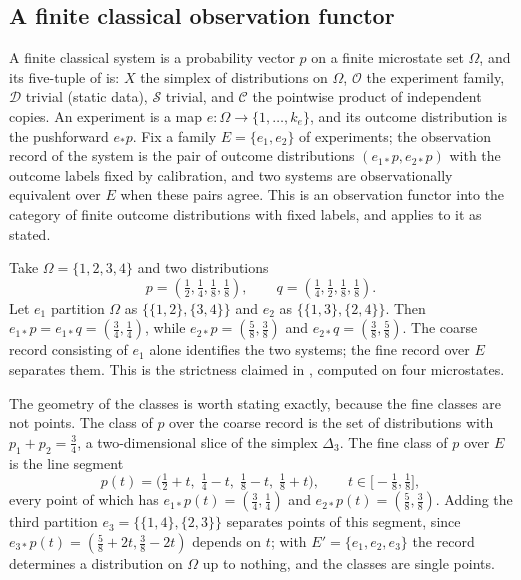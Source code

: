 \documentclass[11pt,letterpaper]{article}
\theoremstyle{definition}
\theoremstyle{remark}
\begin{document}
\subsection{A finite classical observation functor}

A finite classical system is a probability vector $p$ on a finite microstate set $\Omega$, and its five-tuple of  is: $X$ the simplex of distributions on $\Omega$, $\mathcal{O}$ the experiment family, $\mathcal{D}$ trivial (static data), $\mathcal{S}$ trivial, and $\mathcal{C}$ the pointwise product of independent copies. An experiment is a map $e \colon \Omega \to \{1, \ldots, k_e\}$, and its outcome distribution is the pushforward $e_* p$. Fix a family $E = \{e_1, e_2\}$ of experiments; the observation record of the system is the pair of outcome distributions $(e_{1*} p, e_{2*} p)$ with the outcome labels fixed by calibration, and two systems are observationally equivalent over $E$ when these pairs agree. This is an observation functor into the category of finite outcome distributions with fixed labels, and  applies to it as stated.

Take $\Omega = \{1, 2, 3, 4\}$ and two distributions
\[
p = (\tfrac{1}{2}, \tfrac{1}{4}, \tfrac{1}{8}, \tfrac{1}{8}),
\qquad
q = (\tfrac{1}{4}, \tfrac{1}{2}, \tfrac{1}{8}, \tfrac{1}{8}).
\]
Let $e_1$ partition $\Omega$ as $\{\{1,2\}, \{3,4\}\}$ and $e_2$ as $\{\{1,3\}, \{2,4\}\}$. Then $e_{1*} p = e_{1*} q = (\tfrac{3}{4}, \tfrac{1}{4})$, while $e_{2*} p = (\tfrac{5}{8}, \tfrac{3}{8})$ and $e_{2*} q = (\tfrac{3}{8}, \tfrac{5}{8})$. The coarse record consisting of $e_1$ alone identifies the two systems; the fine record over $E$ separates them. This is the strictness claimed in , computed on four microstates.

The geometry of the classes is worth stating exactly, because the fine classes are not points. The class of $p$ over the coarse record is the set of distributions with $p_1 + p_2 = \tfrac{3}{4}$, a two-dimensional slice of the simplex $\Delta_3$. The fine class of $p$ over $E$ is the line segment
\[
p(t) = \bigl(\tfrac{1}{2} + t,\; \tfrac{1}{4} - t,\; \tfrac{1}{8} - t,\; \tfrac{1}{8} + t\bigr),
\qquad t \in \bigl[-\tfrac{1}{8}, \tfrac{1}{8}\bigr],
\]
every point of which has $e_{1*} p(t) = (\tfrac{3}{4}, \tfrac{1}{4})$ and $e_{2*} p(t) = (\tfrac{5}{8}, \tfrac{3}{8})$. Adding the third partition $e_3 = \{\{1,4\}, \{2,3\}\}$ separates points of this segment, since $e_{3*} p(t) = (\tfrac{5}{8} + 2t, \tfrac{3}{8} - 2t)$ depends on $t$; with $E' = \{e_1, e_2, e_3\}$ the record determines a distribution on $\Omega$ up to nothing, and the classes are single points.
\end{document}
